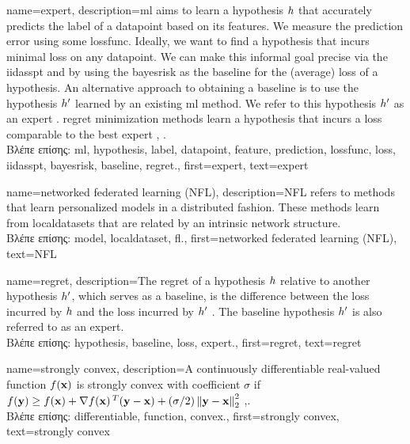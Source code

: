 {name={expert},
	description={\gls{ml} aims to learn a \gls{hypothesis} $h$ that accurately predicts the \gls{label} 
		of a \gls{datapoint} based on its \gls{feature}s. We measure the \gls{prediction} error using 
		some \gls{lossfunc}. Ideally, we want to find a \gls{hypothesis} that incurs minimal \gls{loss} 
		on any \gls{datapoint}. We can make this informal goal precise via the \gls{iidasspt} 
		and by using the \gls{bayesrisk} as the \gls{baseline} for the (average) \gls{loss} of a \gls{hypothesis}. 
		An alternative approach to obtaining a \gls{baseline} is to use the \gls{hypothesis} $h'$ learned 
		by an existing \gls{ml} method. We refer to this \gls{hypothesis} $h'$ as an expert \cite{PredictionLearningGames}. 
		\Gls{regret} minimization methods learn a \gls{hypothesis}
		that incurs a \gls{loss} comparable to the best expert \cite{PredictionLearningGames}, \cite{HazanOCO}.\\
		\foreignlanguage{greek}{Βλέπε επίσης:} \gls{ml}, \gls{hypothesis}, \gls{label}, \gls{datapoint}, \gls{feature}, \gls{prediction}, 
		\gls{lossfunc}, \gls{loss}, \gls{iidasspt}, \gls{bayesrisk}, \gls{baseline}, \gls{regret}.},
	first={expert},
	text={expert} 
}

{name={networked federated learning (NFL)},
	description={NFL refers to methods that learn 
		personalized \gls{model}s in a distributed fashion. These methods learn from \gls{localdataset}s 
		that are related by an intrinsic network structure.\\
		\foreignlanguage{greek}{Βλέπε επίσης:} \gls{model}, \gls{localdataset}, \gls{fl}.},
 	first={networked federated learning (NFL)},
	text={NFL} 
}

{name={regret},
	description={The regret of a \gls{hypothesis} $h$ relative to 
		another \gls{hypothesis} $h'$, which serves as a \gls{baseline}, 
		is the difference between the \gls{loss} incurred by $h$ and the \gls{loss} 
		incurred by $h'$ \cite{PredictionLearningGames}. 
		The \gls{baseline} \gls{hypothesis} $h'$ is also referred to as an \gls{expert}.\\
		\foreignlanguage{greek}{Βλέπε επίσης:} \gls{hypothesis}, \gls{baseline}, \gls{loss}, \gls{expert}.},
	first={regret},
	text={regret} 
}

{name={strongly convex},
	description={A continuously \gls{differentiable} real-valued 
		\gls{function} $f({\bf x})$ is strongly \gls{convex} with coefficient 
		$\sigma$ if $f({\bf y}) \geq f({\bf x}) + \nabla f({\bf x})\,^{T} ({\bf y} - {\bf x}) + (\sigma/2) \left\Vert {{\bf y}- {\bf x}} \right\Vert_{2}^{2}$ 
		\cite{nesterov04},\cite[Sec. B.1.1]{CvxAlgBertsekas}.\\
		\foreignlanguage{greek}{Βλέπε επίσης:} \gls{differentiable}, \gls{function}, \gls{convex}.},
	first={strongly convex},
	text={strongly convex} 
}

